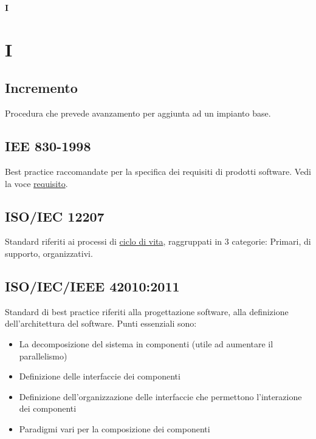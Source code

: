 	{\Huge{\textbf{I}}} \\
	\section{I}

	\subsection{Incremento}
	\label{sec:incremento}
	Procedura che prevede avanzamento per aggiunta ad un impianto base.

	\subsection{IEE 830-1998}
	\label{sec:iee830}
	Best practice raccomandate per la specifica dei requisiti di prodotti software. Vedi la voce \hyperref[sec:requisito]{requisito}.
	\linebreak

	\subsection{ISO/IEC 12207}
	\label{sec:iso12207}
	Standard riferiti ai processi di \hyperref[sec:ciclodivita]{ciclo di vita}, raggruppati in 3 categorie: Primari, di supporto, organizzativi.
	\linebreak

	\subsection{ISO/IEC/IEEE 42010:2011}
	\label{sec:iso12207}
	Standard di best practice riferiti alla progettazione software, alla definizione dell'architettura del software. Punti essenziali sono:
	\begin{itemize}  
	\item La decomposizione del sistema in componenti (utile ad aumentare il parallelismo)
	\item Definizione delle interfaccie dei componenti 
	\item Definizione dell'organizzazione delle interfaccie che permettono l'interazione dei componenti
	\item Paradigmi vari per la composizione dei componenti 
	\end{itemize}		


